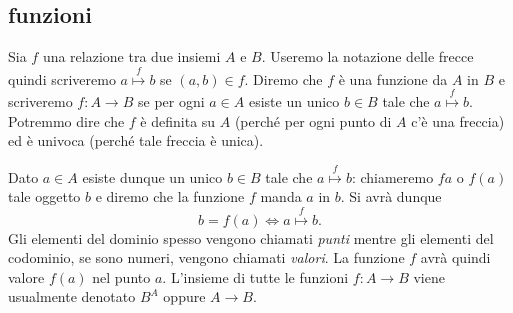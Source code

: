 \subsection{funzioni}

Sia $f$ una relazione tra due insiemi $A$ e $B$. 
Useremo la notazione delle frecce quindi scriveremo $a\stackrel f\mapsto b$ 
se $(a,b)\in f$. 
Diremo che $f$ è una funzione da $A$ in $B$ e scriveremo 
$f\colon A\to B$ se per ogni $a\in A$ esiste un unico $b\in B$ 
tale che $a \stackrel f \mapsto b$.
Potremmo dire che $f$ è definita su $A$ 
(perché per ogni punto di $A$ c'è una freccia)
ed è univoca (perché tale freccia è unica).

Dato $a\in A$ esiste dunque un unico $b\in B$ tale che
$a\stackrel f \mapsto b$: chiameremo $fa$
o $f(a)$ 
%
tale oggetto $b$
e diremo che la funzione $f$ manda $a$ in $b$. 
Si avrà dunque
\[
 b=f(a) \iff a\stackrel f \mapsto b.
\]
Gli elementi del dominio spesso vengono chiamati \emph{punti}
mentre gli elementi del codominio, se sono numeri, vengono 
chiamati \emph{valori}. 
La funzione $f$ avrà quindi valore $f(a)$ nel punto $a$.
L'insieme di tutte le funzioni $f\colon A\to B$ viene usualmente denotato $B^A$
oppure $A\to B$.
%
%
%
%

